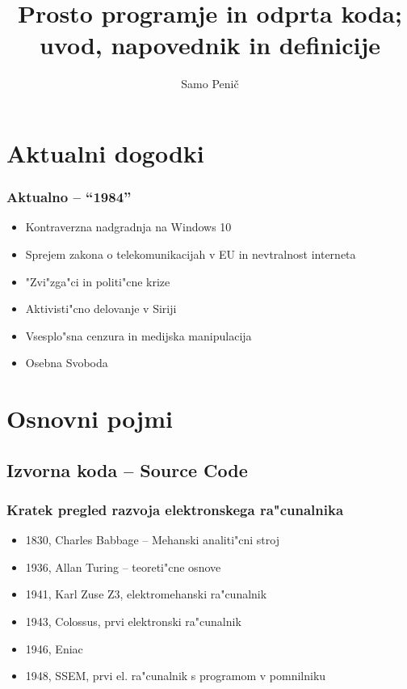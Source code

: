 \documentclass{beamer}
\title[Odprta koda]{Prosto programje in odprta koda; uvod, napovednik in definicije}
\author{Samo Peni\v{c}\\}
\date{
\center{Delavnica v KuFE, Ljubljana 3.11.2015}
}
\begin{document}
\frame{\titlepage}

\section{Aktualni dogodki}
\begin{frame}
\frametitle{Aktualno -- ``1984''}
\begin{itemize}
\item Kontraverzna nadgradnja na Windows 10
\item Sprejem zakona o telekomunikacijah v EU in nevtralnost interneta
\item "Zvi"zga"ci in politi"cne krize
\item Aktivisti"cno delovanje v Siriji
\item Vsesplo"sna cenzura in medijska manipulacija
\item Osebna Svoboda
\end{itemize}
\end{frame}

\section{Osnovni pojmi}

\subsection{Izvorna koda -- Source Code}
\begin{frame}
\frametitle{Kratek pregled razvoja elektronskega ra"cunalnika}
\begin{itemize}
\item 1830, Charles Babbage -- Mehanski analiti"cni stroj
\item 1936, Allan Turing -- teoreti"cne osnove
\item 1941, Karl Zuse Z3, elektromehanski ra"cunalnik
\item 1943, Colossus, prvi elektronski ra"cunalnik
\item 1946, Eniac
\item 1948, SSEM, prvi el. ra"cunalnik s programom v pomnilniku
\end{itemize}
\end{frame}
\end{document}
